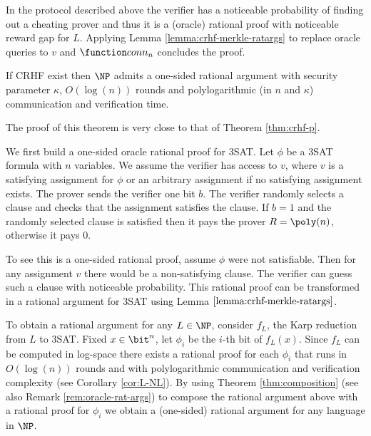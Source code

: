\begin{proofsketch}
	
	In the protocol described above the verifier has a noticeable probability of finding out a cheating prover and thus it is a (oracle) rational proof with noticeable reward gap for $L$. Applying Lemma \ref{lemma:crhf-merkle-ratargs} to replace oracle queries to $v$ and $\conn$ concludes the proof.
	
\end{proofsketch}

\begin{theorem}
	\label{thm:crhf-np}
	If CRHF exist then $\NP$ admits a one-sided rational argument with security parameter $\kappa$, $O(\log(n))$ rounds and polylogarithmic (in $n$ and $\kappa$) communication and verification time.
\end{theorem}
\begin{proofsketch}
	The proof of this theorem is very close to that of Theorem \ref{thm:crhf-p}.
	
	We first build a one-sided oracle rational proof for 3SAT.
	Let $\phi$ be a 3SAT formula with $n$ variables. We assume the verifier has access to $v$, where $v$ is a satisfying assignment for $\phi$ or an arbitrary assignment if no satisfying assignment exists. The prover sends the verifier one bit $b$. The verifier randomly selects a clause and checks that the assignment satisfies the clause.
	If $b=1$ and the randomly selected clause is satisfied then it pays the prover $R = \poly(n)$, otherwise it pays 0.
	
	To see this is a one-sided rational proof, assume $\phi$ were not satisfiable. Then for any assignment $v$ there would be a non-satisfying clause.
	The verifier can guess such a clause with noticeable probability. This rational proof can be transformed in a rational argument for 3SAT using Lemma $\ref{lemma:crhf-merkle-ratargs}$.
	
	To obtain a rational argument for any $L \in \NP$, consider $f_L$, the Karp reduction from $L$ to 3SAT. 
	Fixed $x \in \bit^n$, let $\phi_i$ be the $i$-th bit of $f_L(x)$. Since $f_L$ can be computed in log-space there exists a rational
	proof for each $\phi_i$ that runs in $O(\log(n))$ rounds and with polylogarithmic communication and verification complexity
	(see Corollary \ref{cor:L-NL}). By using Theorem \ref{thm:composition} (see also Remark \ref{rem:oracle-rat-args}) to compose the rational argument above with
	a rational proof for $\phi_i$ we obtain a (one-sided) rational argument for any language in $\NP$. 
\end{proofsketch}

\begin{comment}
\begin{remark}[Reducing round complexity of our arguments]
	Theorem 5 in $\cite{ratargs}$ allows to transform a rational proof with $r$ rounds in a 1-round rational arguments assuming Private Information Retrieval (PIR) schemes. Unfortunately such theorem is not applicable to the arguments above because they are not history-ignorant
\end{remark}
\end{comment}

